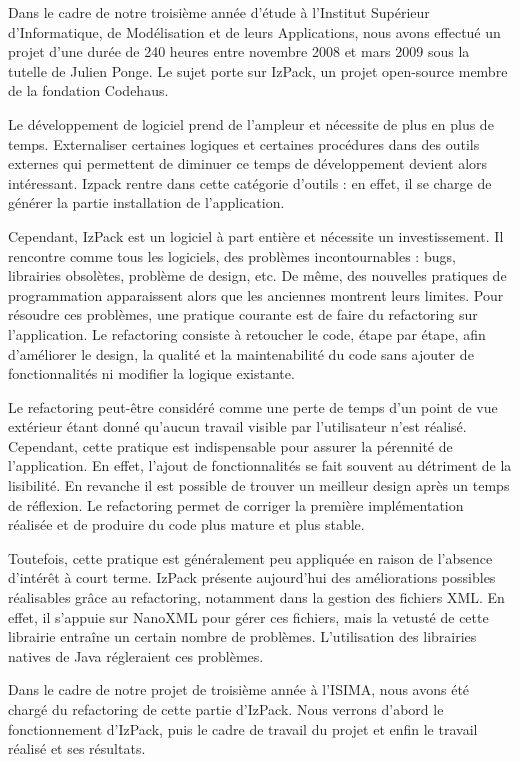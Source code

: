 Dans le cadre de notre troisième année d'étude à l'Institut Supérieur d'Informatique, de Modélisation et de leurs Applications, nous avons effectué un projet d'une durée de 240 heures entre novembre 2008 et mars 2009 sous la tutelle de Julien Ponge.
Le sujet porte sur IzPack, un projet open-source membre de la fondation Codehaus.

Le développement de logiciel prend de l'ampleur et nécessite de plus en plus de temps.
Externaliser certaines logiques et certaines procédures dans des outils externes qui permettent de diminuer ce temps de développement devient alors intéressant.
Izpack rentre dans cette catégorie d'outils : en effet, il se charge de générer la partie installation de l'application.

Cependant, IzPack est un logiciel à part entière et nécessite un investissement.
Il rencontre comme tous les logiciels, des problèmes incontournables : bugs, librairies obsolètes, problème de design, etc.
De même, des nouvelles pratiques de programmation apparaissent alors que les anciennes montrent leurs limites.
Pour résoudre ces problèmes, une pratique courante est de faire du refactoring sur l'application.
Le refactoring consiste à retoucher le code, étape par étape, afin d'améliorer le design, la qualité et la maintenabilité du code sans ajouter de fonctionnalités ni modifier la logique existante.

Le refactoring peut-être considéré comme une perte de temps d'un point de vue extérieur étant donné qu'aucun travail visible par l'utilisateur n'est réalisé.
Cependant, cette pratique est indispensable pour assurer la pérennité de l'application.
En effet, l'ajout de fonctionnalités se fait souvent au détriment de la lisibilité.
En revanche il est possible de trouver un meilleur design après un temps de réflexion.
Le refactoring permet de corriger la première implémentation réalisée et de produire du code plus mature et plus stable.

Toutefois, cette pratique est généralement peu appliquée en raison de l'absence d'intérêt à court terme.
IzPack présente aujourd'hui des améliorations possibles réalisables grâce au refactoring, notamment dans la gestion des fichiers XML.
En effet, il s'appuie sur NanoXML pour gérer ces fichiers, mais la vetusté de cette librairie entraîne un certain nombre de problèmes.
L'utilisation des librairies natives de Java régleraient ces problèmes.

Dans le cadre de notre projet de troisième année à l'ISIMA, nous avons été chargé du refactoring de cette partie d'IzPack.
Nous verrons d'abord le fonctionnement d'IzPack, puis le cadre de travail du projet et enfin le travail réalisé et ses résultats.